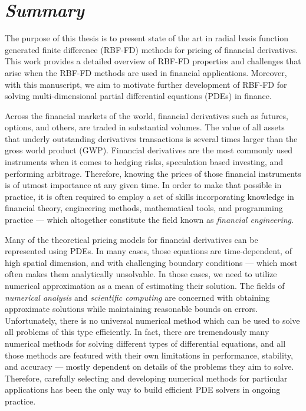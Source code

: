 \documentclass{UUThesisTemplate}
\begin{document}
\newpage
\chapter*{{{\sffamily\emph{Summary}}}}
{\noteunic

\par
The purpose of this thesis is to present state of the art in radial basis function generated finite difference (RBF-FD) methods for pricing of financial derivatives. This work provides a detailed overview of RBF-FD properties and challenges that arise when the RBF-FD methods are used in financial applications. Moreover, with this manuscript, we aim to motivate further development of RBF-FD for solving multi-dimensional partial differential equations (PDEs) in finance.

\par
Across the financial markets of the world, financial derivatives such as futures, options, and others, are traded in substantial volumes. The value of all assets that underly outstanding derivatives transactions is several times larger than the gross world product (GWP). Financial derivatives are the most commonly used instruments when it comes to hedging risks, speculation based investing, and performing arbitrage. Therefore, knowing the prices of those financial instruments is of utmost importance at any given time. In order to make that possible in practice, it is often required to employ a set of skills incorporating knowledge in financial theory, engineering methods, mathematical tools, and programming practice --- which altogether constitute the field known as \emph{financial engineering}. 

\par
Many of the theoretical pricing models for financial derivatives can be represented using PDEs. In many cases, those equations are time-dependent, of high spatial dimension, and with challenging boundary conditions --- which most often makes them analytically unsolvable. In those cases, we need to utilize numerical approximation as a mean of estimating their solution. The fields of \emph{numerical analysis} and \emph{scientific computing} are concerned with obtaining approximate solutions while maintaining reasonable bounds on errors. Unfortunately, there is no universal numerical method which can be used to solve all problems of this type efficiently. In fact, there are tremendously many numerical methods for solving different types of differential equations, and all those methods are featured with their own limitations in performance, stability, and accuracy --- mostly dependent on details of the problems they aim to solve. Therefore, carefully selecting and developing numerical methods for particular applications has been the only way to build efficient PDE solvers in ongoing practice. 

}
\end{document}
